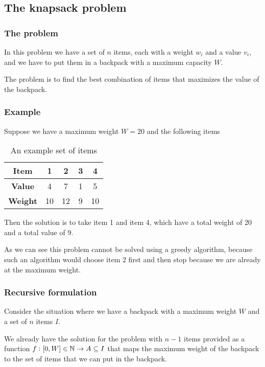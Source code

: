 \documentclass[12pt]{extarticle}
\begin{document}
\subsection{The knapsack problem}

\subsubsection{The problem}

In this problem we have a set of $n$ items, each with a weight $w_i$ and a value $v_i$, and we have to put them in a backpack with a maximum capacity $W$.

The problem is to find the best combination of items that maximizes the value of the backpack.

\subsubsection{Example}

Suppose we have a maximum weight $W = 20$ and the following items

\begin{table}[H]
    \centering
    \begin{tabular}{ |c|c|c|c|c| }
        \hline
        \textbf{Item}   & 1  & 2  & 3 & 4  \\
        \hline
        \textbf{Value}  & 4  & 7  & 1 & 5  \\
        \textbf{Weight} & 10 & 12 & 9 & 10 \\
        \hline
    \end{tabular}

    \label{tab:knapsack_example}
    \caption{An example set of items}
\end{table}

Then the solution is to take item 1 and item 4, which have a total weight of 20 and a total value of 9.

As we can see this problem cannot be solved using a greedy algorithm, because such an algorithm would choose item 2 first and then stop because we are already at the maximum weight.

\subsubsection{Recursive formulation}

Consider the situation where we have a backpack with a maximum weight $W$ and a set of $n$ items $I$.

We already have the solution for the problem with $n-1$ items provided as a function $f : [0, W] \in \mathbb{N} \to A \subseteq I$ that maps the maximum weight of the backpack to the set of items that we can put in the backpack.
\end{document}
